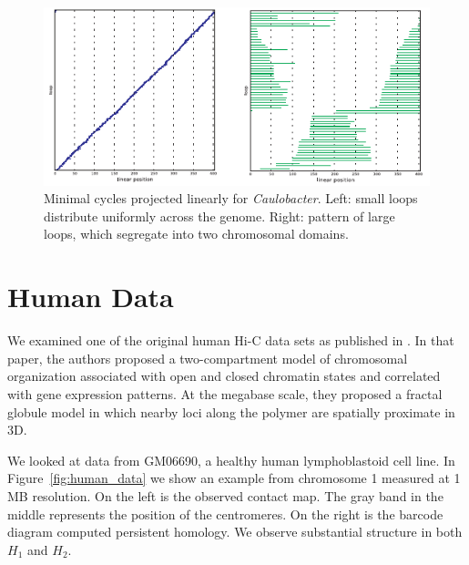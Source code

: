 
\begin{figure}
       \centering
       \includegraphics[width=\columnwidth]{./fig/caulobacter_localized_loops.pdf}
       \caption{Minimal cycles projected linearly for \emph{Caulobacter}. Left: small loops distribute uniformly across the genome. Right: pattern of large loops, which segregate into two chromosomal domains.}
       \label{fig:caulobacter_bar_sizes}
\end{figure}

\section{Human Data}
\label{sec:human_data}
%
We examined one of the original human Hi-C data sets as published in \cite{LiebermanAiden:2009jz}.
In that paper, the authors proposed a two-compartment model of chromosomal organization associated with open and closed chromatin states and correlated with gene expression patterns.
At the megabase scale, they proposed a fractal globule model in which nearby loci along the polymer are spatially proximate in 3D.

We looked at data from GM06690, a healthy human lymphoblastoid cell line.
In Figure~\ref{fig:human_data} we show an example from chromosome 1 measured at 1 MB resolution.
On the left is the observed contact map.
The gray band in the middle represents the position of the centromeres.
On the right is the barcode diagram computed persistent homology.
We observe substantial structure in both $H_1$ and $H_2$.

